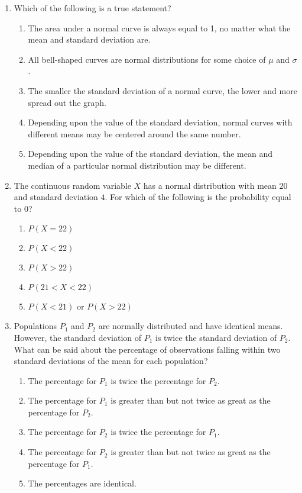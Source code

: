 \documentclass{article}
\begin{document}
\begin{enumerate}

\item Which of the following is a true statement? 
\begin{enumerate}
  \item The area under a normal curve is always equal to 1, no matter what the mean and standard deviation are.
  \item All bell-shaped curves are normal distributions for some choice of $\mu$ and $\sigma$.
  \item The smaller the standard deviation of a normal curve, the lower and more spread out the graph.
  \item Depending upon the value of the standard deviation, normal curves with different means may be centered around the same number.
  \item Depending upon the value of the standard deviation, the mean and median of a particular normal distribution may be different.
\end{enumerate}

\item The continuous random variable $X$ has a normal distribution with mean $20$ and standard deviation $4$. For which of the following is the probability equal to $0$? 
\begin{enumerate}
  \item $P(X=22)$
  \item $P(X<22)$
  \item $P(X>22)$
  \item $P(21<X<22)$
  \item $P(X<21)\text{ or }P(X>22)$
\end{enumerate}

\item Populations $P_1$ and $P_2$ are normally distributed and have identical means. However, the standard deviation of $P_1$ is twice the standard deviation of $P_2$. What can be said about the percentage of observations falling within two standard deviations of the mean for each population? 
\begin{enumerate}
  \item The percentage for $P_1$ is twice the percentage for $P_2$.
  \item The percentage for $P_1$ is greater than but not twice as great as the percentage for $P_2$.
  \item The percentage for $P_2$ is twice the percentage for $P_1$.
  \item The percentage for $P_2$ is greater than but not twice as great as the percentage for $P_1$.
  \item The percentages are identical.
\end{enumerate}


\end{enumerate}
\end{document}
